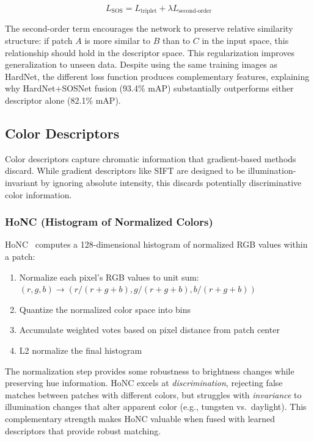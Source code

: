 \begin{equation}
    L_{\text{SOS}} = L_{\text{triplet}} + \lambda L_{\text{second-order}}
\end{equation}

The second-order term encourages the network to preserve relative similarity structure: if patch $A$ is more similar to $B$ than to $C$ in the input space, this relationship should hold in the descriptor space. This regularization improves generalization to unseen data. Despite using the same training images as HardNet, the different loss function produces complementary features, explaining why HardNet+SOSNet fusion (93.4\% mAP) substantially outperforms either descriptor alone (82.1\% mAP).

\subsection{Color Descriptors}

Color descriptors capture chromatic information that gradient-based methods discard. While gradient descriptors like SIFT are designed to be illumination-invariant by ignoring absolute intensity, this discards potentially discriminative color information.

\subsubsection{HoNC (Histogram of Normalized Colors)}

HoNC~\cite{olson2016keypoint} computes a 128-dimensional histogram of normalized RGB values within a patch:

\begin{enumerate}
    \item Normalize each pixel's RGB values to unit sum: $(r, g, b) \rightarrow (r/(r+g+b), g/(r+g+b), b/(r+g+b))$
    \item Quantize the normalized color space into bins
    \item Accumulate weighted votes based on pixel distance from patch center
    \item L2 normalize the final histogram
\end{enumerate}

The normalization step provides some robustness to brightness changes while preserving hue information. HoNC excels at \textit{discrimination}, rejecting false matches between patches with different colors, but struggles with \textit{invariance} to illumination changes that alter apparent color (e.g., tungsten vs.\ daylight). This complementary strength makes HoNC valuable when fused with learned descriptors that provide robust matching.

